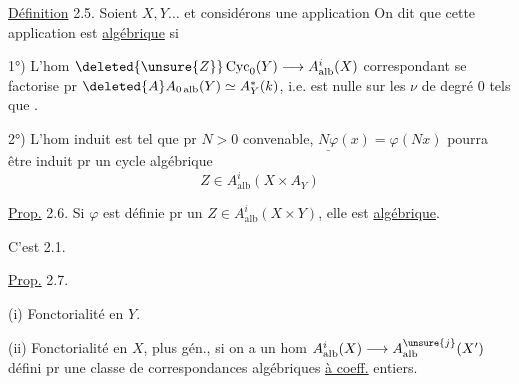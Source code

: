\uline{Définition} 2.5. Soient \(X,Y\ldots\) et considérons une application
On dit que cette application est \uline{algébrique} si

1°) L'hom \(\deleted{\unsure{Z}}\operatorname{Cyc}_0(Y)\longrightarrow A^i_{\mathrm{alb}}(X)\) correspondant se factorise pr \(\deleted{A}A_{0\,\mathrm{alb}}(Y)\simeq A_Y^*(k)\), i.e.  est nulle sur les \(\nu\) de degré 0 tels que .

2°) L'hom induit
est tel que pr \(N>0\) convenable, \(\underline{N\varphi}(x)=\varphi(Nx)\) pourra être induit pr un cycle algébrique
\[
Z\in A^i_{\mathrm{alb}}(X\times A_Y)
\]

\uline{Prop.} 2.6. Si \(\varphi\) est définie pr un \(Z\in A^i_{\mathrm{alb}}(X\times Y)\), elle est \uline{algébrique}.

C'est 2.1.

\uline{Prop.} 2.7. 

(i) Fonctorialité en \(Y\). 

(ii) Fonctorialité en \(X\), plus gén., si on a un hom \(A^i_{\mathrm{alb}}(X)\longrightarrow A^{\unsure{j}}_{\mathrm{alb}}(X')\) défini pr une classe de correspondances algébriques \uline{à coeff.}  entiers.
